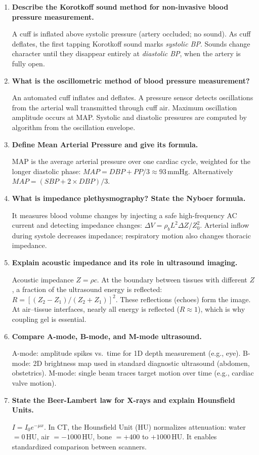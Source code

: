 \documentclass[12pt,a4paper]{article}
\newcommand{\Q}[1]{\textbf{#1}\par\noindent\ignorespaces}
\begin{document}
\begin{tcolorbox}[exambox, title={\textbf{Frequently Asked / Viva Questions}}]
\begin{enumerate}[topsep=0pt, label=\textbf{Q\arabic*.}, itemsep=5pt]
  \item \Q{Describe the Korotkoff sound method for non-invasive blood pressure measurement.}
    A cuff is inflated above systolic pressure (artery occluded; no sound). As cuff deflates, the first tapping Korotkoff sound marks \textit{systolic BP}. Sounds change character until they disappear entirely at \textit{diastolic BP}, when the artery is fully open.
  \item \Q{What is the oscillometric method of blood pressure measurement?}
    An automated cuff inflates and deflates. A pressure sensor detects oscillations from the arterial wall transmitted through cuff air. Maximum oscillation amplitude occurs at MAP. Systolic and diastolic pressures are computed by algorithm from the oscillation envelope.
  \item \Q{Define Mean Arterial Pressure and give its formula.}
    MAP is the average arterial pressure over one cardiac cycle, weighted for the longer diastolic phase: $MAP = DBP + PP/3 \approx 93\,\text{mmHg}$. Alternatively $MAP = (SBP + 2\times DBP)/3$.
  \item \Q{What is impedance plethysmography? State the Nyboer formula.}
    It measures blood volume changes by injecting a safe high-frequency AC current and detecting impedance changes: $\Delta V = \rho_b L^2 \Delta Z / Z_0^2$. Arterial inflow during systole decreases impedance; respiratory motion also changes thoracic impedance.
  \item \Q{Explain acoustic impedance and its role in ultrasound imaging.}
    Acoustic impedance $Z = \rho c$. At the boundary between tissues with different $Z$, a fraction of the ultrasound energy is reflected: $R = [(Z_2-Z_1)/(Z_2+Z_1)]^2$. These reflections (echoes) form the image. At air--tissue interfaces, nearly all energy is reflected ($R \approx 1$), which is why coupling gel is essential.
  \item \Q{Compare A-mode, B-mode, and M-mode ultrasound.}
    A-mode: amplitude spikes vs.\ time for 1D depth measurement (e.g., eye). B-mode: 2D brightness map used in standard diagnostic ultrasound (abdomen, obstetrics). M-mode: single beam traces target motion over time (e.g., cardiac valve motion).
  \item \Q{State the Beer-Lambert law for X-rays and explain Hounsfield Units.}
    $I = I_0 e^{-\mu x}$. In CT, the Hounsfield Unit (HU) normalizes attenuation: water $= 0\,\text{HU}$, air $= -1000\,\text{HU}$, bone $= +400$ to $+1000\,\text{HU}$. It enables standardized comparison between scanners.

\end{enumerate}
\end{tcolorbox}
\end{document}
